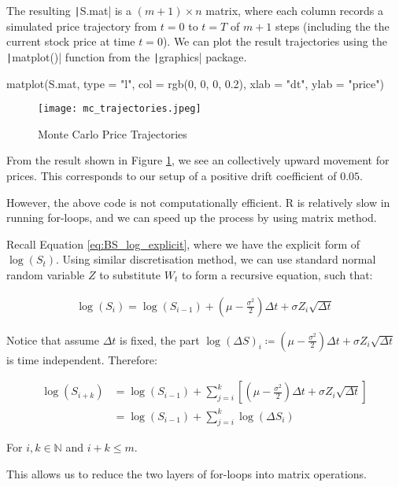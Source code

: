The resulting \texttt|S.mat| is a $(m + 1) \times n$ matrix, where each column records a simulated price trajectory from $t=0$ to $t=T$ of $m+1$ steps (including the the current stock price at time $t=0$). We can plot the result trajectories using the \texttt|matplot()| function from the \texttt|graphics| package.

\begin{Rminted}
matplot(S.mat, type = "l", col = rgb(0, 0, 0, 0.2),
        xlab = "dt", ylab = "price")
\end{Rminted}

\begin{figure}[H]
	\centering
	\texttt{[image: mc\_trajectories.jpeg]}
	\caption{Monte Carlo Price Trajectories} \label{img:mc_trajectories}
\end{figure}

From the result shown in Figure \ref{img:mc_trajectories}, we see an collectively upward movement for prices. This corresponds to our setup of a positive drift coefficient of $0.05$.

However, the above code is not computationally efficient. R is relatively slow in running for-loops, and we can speed up the process by using matrix method.

Recall Equation \ref{eq:BS_log_explicit}, where we have the explicit form of $\log(S_t)$. Using similar discretisation method, we can use standard normal random variable $Z$ to substitute $W_t$ to form a recursive equation, such that:

\begin{align*}
\log(S_i) = \log(S_{i-1}) + (\mu - \frac{\sigma^2}{2})\Delta t + \sigma Z_i \sqrt{\Delta t}
\end{align*}

Notice that assume $\Delta t$ is fixed, the part $\log(\Delta S)_i\coloneqq(\mu - \frac{\sigma^2}{2})\Delta t + \sigma Z_i \sqrt{\Delta t}$ is time independent. Therefore:

\begin{align}
\log(S_{i+k}) &= \log(S_{i-1}) + \sum_{j=i}^{k}{\left[(\mu - \frac{\sigma^2}{2})\Delta t + \sigma Z_i \sqrt{\Delta t}\right]} \\
&= \log(S_{i-1}) + \sum_{j=i}^{k}{\log(\Delta S_i)} \label{eq:mc_matrix}
\end{align}

For $i,k\in\mathbb{N}$ and $i+k\leq m$.

This allows us to reduce the two layers of for-loops into matrix operations.

